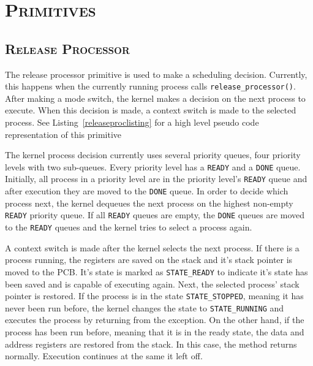 \documentclass[oneside]{report}
\begin{document}
\section{\textsc{Primitives}}

\subsection{\textsc{Release Processor}}
The release processor primitive is used to make a scheduling decision.
Currently, this happens when the currently running process calls
\texttt{release\_processor()}. After making a mode switch, the kernel makes a
decision on the next process to execute. When this decision is made, a context
switch is made to the selected process. See Listing~\ref{releaseproclisting}
for a high level pseudo code representation of this primitive

The kernel process decision currently uses several priority queues, four
priority levels with two sub-queues. Every priority level has a \texttt{READY} and a
\texttt{DONE} queue. Initially, all process in a priority level are in the
priority level's \texttt{READY} queue and after execution they are moved to the
\texttt{DONE} queue. In order to decide which process next, the kernel dequeues
the next process on the highest non-empty \texttt{READY} priority queue. If all
\texttt{READY} queues are empty, the \texttt{DONE} queues are moved to the
\texttt{READY} queues and the kernel tries to select a process again.

A context switch is made after the kernel selects the next process. If there is
a process running, the registers are saved on the stack and it's stack pointer
is moved to the PCB. It's state is marked as \texttt{STATE\_READY} to indicate
it's state has been saved and is capable of executing again. Next, the selected
process' stack pointer is restored. If the process is in the state
\texttt{STATE\_STOPPED}, meaning it has never been run before, the kernel
changes the state to \texttt{STATE\_RUNNING} and executes the process by
returning from the exception. On the other hand, if the process has been run
before, meaning that it is in the ready state, the data and address registers
are restored from the stack. In this case, the method returns normally.
Execution continues at the same it left off.
\end{document}
